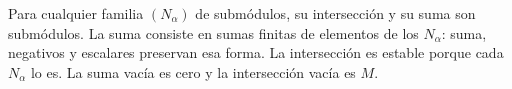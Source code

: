 Para cualquier familia $(N_\alpha)$ de submódulos, su intersección y su suma son submódulos. La suma consiste en sumas finitas de elementos de los $N_\alpha$: suma, negativos y escalares preservan esa forma. La intersección es estable porque cada $N_\alpha$ lo es. La suma vacía es cero y la intersección vacía es $M$.
